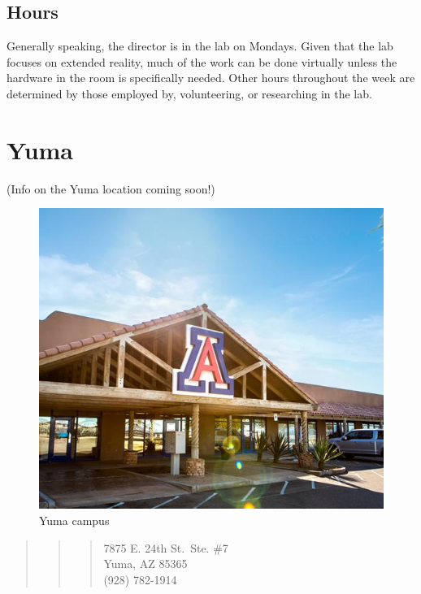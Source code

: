 \documentclass[]{tufte-book}
\begin{document}
\hypertarget{hours}{%
\subsection{Hours}\label{hours}}

Generally speaking, the director is in the lab on Mondays. Given that the lab focuses on extended reality, much of the work can be done virtually unless the hardware in the room is specifically needed. Other hours throughout the week are determined by those employed by, volunteering, or researching in the lab.

\hypertarget{yuma}{%
\section{Yuma}\label{yuma}}

(Info on the Yuma location coming soon!)

\begin{figure}
\centering
\includegraphics{images/yuma_building.jpeg}
\caption{Yuma campus}
\end{figure}

\begin{quote}
\begin{quote}
\begin{quote}
7875 E. 24th St.~Ste. \#7\\
Yuma, AZ 85365\\
(928) 782-1914
\end{quote}
\end{quote}
\end{quote}
\end{document}
